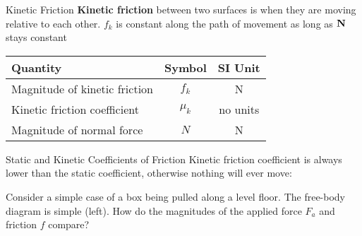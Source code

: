 \documentclass[12pt,compress,aspectratio=169]{beamer}
\newcommand{\mb}[1]{\ensuremath\mathbf{#1}}
\newcommand{\eq}[2]{\vspace{#1}{\Large\begin{displaymath}#2\end{displaymath}}}
\begin{document}
\begin{frame}{Kinetic Friction}
  \textbf{Kinetic friction} between two surfaces is when they are moving
  relative to each other. $f_k$ is constant along the path of movement as long
  as $\mb{N}$ stays constant

  \eq{-.3in}{
    \boxed{f_k = \mu_kN}
  }
  \begin{center}
    \begin{tabular}{l|c|c}
      \rowcolor{pink}
      \textbf{Quantity} & \textbf{Symbol} & \textbf{SI Unit} \\ \hline
      Magnitude of kinetic friction & $f_k$ & \si{\newton} \\
      Kinetic friction coefficient  & $\mu_k$ & no units \\
      Magnitude of normal force     & $N$ & \si{\newton}
    \end{tabular}
  \end{center}
\end{frame}



\begin{frame}{Static and Kinetic Coefficients of Friction}    
  Kinetic friction coefficient is always lower than the static coefficient,
  otherwise nothing will ever move:
    
  \eq{-.45in}{
    \mu_k\leq\mu_s
  }

  \vspace{-.2in}Consider a simple case of a box being pulled along a level
  floor. The free-body diagram is simple (left). How do the magnitudes of the
  applied force $F_a$ and friction $f$ compare?

  \vspace{-.2in}
  \begin{columns}
    \begin{center}
    \end{center}

    \begin{center}
    \end{center}
  \end{columns}
\end{frame}
\end{document}
